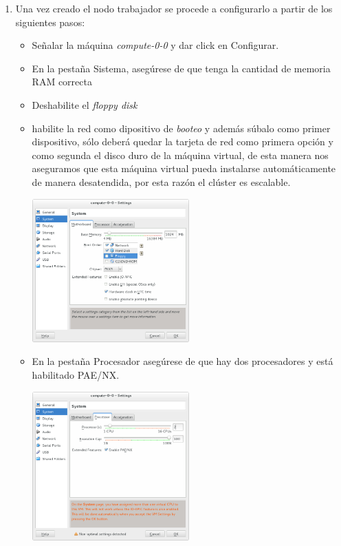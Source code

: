 \begin{enumerate}
\begin{itemize}
\end{itemize}

\item Una vez creado el nodo trabajador se procede a configurarlo a partir de los siguientes pasos:

\begin{itemize}
	\item Señalar la máquina \textit{compute-0-0} y dar click en Configurar.

	\item En la pestaña Sistema, asegúrese de que tenga la cantidad de memoria RAM correcta

	\item Deshabilite el \textit{floppy disk}

	\item habilite la red como dipositivo de \textit{booteo} y además súbalo como primer dispositivo, sólo deberá quedar la tarjeta de red como primera opción y como segunda el disco duro de la máquina virtual, de esta manera nos aseguramos que esta máquina virtual pueda instalarse automáticamente de manera desatendida, por esta razón el clúster es escalable. 

	\includegraphics[width=0.5\textwidth]{aux/nodoopsboot}


	\item En la pestaña Procesador asegúrese de que hay dos procesadores y está habilitado PAE/NX.


	\includegraphics[width=0.5\textwidth]{aux/nodoprocesadores}
	


\end{itemize}
\end{enumerate}
